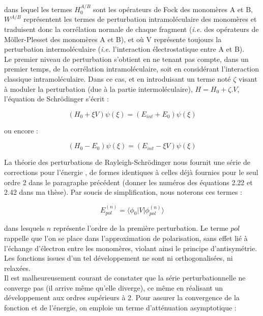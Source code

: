 	\noindent dans lequel les termes $H_{0}^{A/B}$ sont les opérateurs de Fock des monomères A et B, $W^{A/B}$ représentent les termes de perturbation intramoléculaire des monomères et traduisent donc la corrélation \og normale \fg{} de chaque fragment (\textit{i.e.} des opérateurs de Möller-Plesset des monomères A et B), et où V représente toujours la perturbation intermoléculaire (\textit{i.e.} l’interaction électrostatique entre A et B).\\
	
	Le premier niveau de perturbation s’obtient en ne tenant pas compte, dans un premier temps, de la corrélation intramoléculaire, soit en considérant l’interaction classique intramoléculaire. Dans ce cas, et en introduisant un terme noté $\zeta$ visant à moduler la perturbation (due à la partie intermoléculaire), $H = H_0 + \zeta.V$, l’équation de Schr\"{o}dinger s’écrit :
	
	\begin{equation}
	(H_{0} + \xi V) \psi (\xi) = (E_{int} + E_{0}) \psi (\xi)
	\end{equation}
	
	ou encore :
	
	\begin{equation}
	(H_{0} - E_{0}) \psi (\xi) = (E_{int} - \xi V) \psi (\xi)
	\end{equation}
	
	La théorie des perturbations de Rayleigh-Schr\"{o}dinger nous fournit une série de corrections pour l’énergie \cite{chipman1973perturbation}, de formes identiques à celles déjà fournies pour le seul ordre 2 dans le paragraphe précédent (donner les numéros des équations 2.22 et 2.42 dans ma thèse). Par soucis de simplification, nous noterons ces termes :
	
	\begin{equation}
	E_{pol}^{(n)} = \langle \phi_{0}|V| \phi_{pol}^{(n)} \rangle
	\end{equation}
	
	\noindent dans lesquels $n$ représente l’ordre de la première perturbation. Le terme \og $pol$ \fg{} rappelle que l'on se place dans l'approximation de polarisation, sans effet lié à l’échange d’électron entre les monomères, violant ainsi le principe d’antisymétrie. Les fonctions issues d’un tel développement ne sont ni orthogonalisées, ni relaxées.\\
	
	Il est malheureusement courant de constater que la série perturbationnelle ne converge pas (il arrive même qu'elle diverge), ce même en réalisant un développement aux ordres supérieurs à 2. Pour assurer la convergence de la fonction et de l’énergie, on emploie un terme d’atténuation asymptotique : 
	
